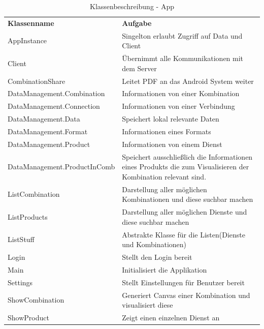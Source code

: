 \begin{table}[h]
	\centering
	\begin{tabularx}{\textwidth}{X X}
		\rowcolor[HTML]{C0C0C0}
		\textbf{Klassenname} & \textbf{Aufgabe} \\
		AppInstance & Singelton erlaubt Zugriff auf Data und Client\\
		\rowcolor[HTML]{E7E7E7}
		Client & Übernimmt alle Kommunikationen mit dem Server \\
		CombinationShare & Leitet PDF an das Android System weiter \\
		\rowcolor[HTML]{E7E7E7}
		DataManagement.Combination & Informationen von einer Kombination \\
		DataManagement.Connection  & Informationen von einer Verbindung \\
		\rowcolor[HTML]{E7E7E7}
		DataManagement.Data & Speichert lokal relevante Daten \\
		DataManagement.Format  & Informationen eines Formats\\
		\rowcolor[HTML]{E7E7E7}
		DataManagement.Product & Informationen von einem Dienst \\
		DataManagement.ProductInComb & Speichert ausschließlich die Informationen eines Produkts die zum Visualisieren der Kombination relevant sind.\\
		\rowcolor[HTML]{E7E7E7}
		ListCombination & Darstellung aller möglichen Kombinationen und diese suchbar machen\\
		ListProducts & Darstellung aller möglichen Dienste und diese suchbar machen\\
		\rowcolor[HTML]{E7E7E7}
		ListStuff & Abstrakte Klasse für die Listen(Dienste und Kombinationen)\\
		Login & Stellt den Login bereit \\
		\rowcolor[HTML]{E7E7E7}
		Main & Initialisiert die Applikation \\
		Settings & Stellt Einstellungen für Benutzer bereit \\
    \rowcolor[HTML]{E7E7E7}
		ShowCombination & Generiert Canvas einer Kombination und visualisiert diese  \\
		ShowProduct & Zeigt einen einzelnen Dienst an
	\end{tabularx}
	\caption{Klassenbeschreibung - App}
	\label{table:klassenbeschreibung-app}
\end{table}
